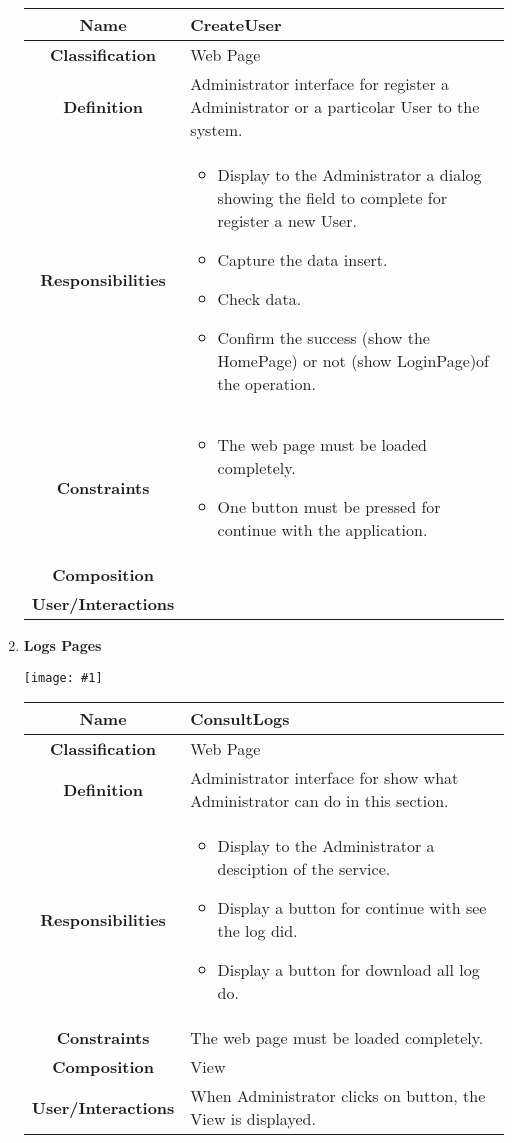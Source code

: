 \documentclass[11pt, a4paper,titlepage]{article}
\newcommand{\image}[1]{
	\begin{center}
		\noindent \texttt{[image: \#1]}
	\end{center}
	}
\begin{document}
\begin{enumerate}
\begin{tabularx}{\textwidth}{| c | X |}
	\hline
	\textbf{Name} & 
	CreateUser
	\\
	\hline
	\textbf{Classification} & 
	Web Page
	\\
	\hline
	\textbf{Definition} & 
	Administrator interface for register a Administrator or a particolar User to the system.
	\\
	\hline
	\textbf{Responsibilities} &
	\begin{itemize}
		\item Display to the Administrator a dialog showing the field to             complete for register a new User.
		\item  Capture the data insert.
		\item Check data.
		\item Confirm the success (show the HomePage) or not (show             LoginPage)of the operation.
	\end{itemize}
	\\
	\hline
	\textbf{Constraints} & 
	\begin{itemize}
		\item  The web page must be loaded completely.
		\item One button must be pressed for continue with the application.
	\end{itemize}
	\\
	\hline
	\textbf{Composition} & 
	\\
	\hline
	\textbf{User/Interactions} &  	
	\\
	\hline	
\end{tabularx}

\newpage
\item \textbf{Logs Pages}\\
\image{page_log.png}
\begin{tabularx}{\textwidth}{| c | X |}
	\hline
	\textbf{Name} & 
	ConsultLogs
	\\
	\hline
	\textbf{Classification} & 
	Web Page
	\\
	\hline
	\textbf{Definition} & 
	Administrator interface for show what Administrator can do in this section.\\
	\hline
	\textbf{Responsibilities} &
	\begin{itemize}
		\item Display to the Administrator a desciption of the service.
		\item  Display a button for continue with see the log did.
		\item Display a button for download all log do.
	\end{itemize}
	\\
	\hline
	\textbf{Constraints} & The web page must be loaded completely.
	\\
	\hline
	\textbf{Composition} & 
	View
	\\
	\hline
	\textbf{User/Interactions} & 
	When Administrator clicks on button, the View is displayed.
	\\
	\hline	
\end{tabularx}


\end{enumerate}
\end{document}
